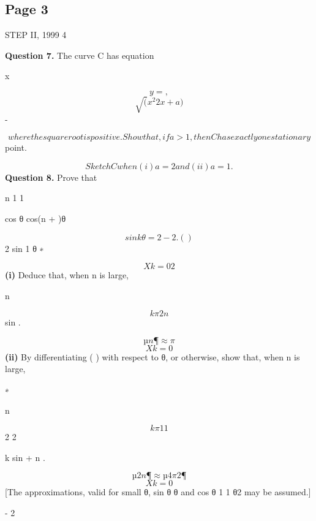 \documentclass[12pt]{article}
\begin{document}
\subsection*{Page 3}
\begin{flushleft}
STEP II, 1999 4\par
\bigskip\textbf{Question 7.} The curve C has equation\par
x\par
\[y = ,\]
\[\sqrt(x^2 2x + a)\]
-\par
\[where the square root is positive. Show that, if a > 1, then C has exactly one stationary\]
point.\par
\[Sketch C when (i) a = 2 and (ii) a = 1.\]
\bigskip\textbf{Question 8.} Prove that\par
n 1 1\par
cos θ cos(n + )θ\par
\[sin kθ = 2 - 2 . ( )\]
2 sin 1 θ ∗\par
\[Xk=0 2\]
\textbf{(i)} Deduce that, when n is large,\par
n\par
\[k\pi 2n\]
sin .\par
\[µ n ¶ \approx \pi\]
\[Xk=0\]
\textbf{(ii)} By differentiating ( ) with respect to θ, or otherwise, show that, when n is large,\par
∗\par
n\par
\[k\pi 1 1\]
2 2\par
k sin + n .\par
\[µ 2n ¶ \approx µ 4 \pi2 ¶\]
\[Xk=0\]
[The approximations, valid for small θ, sin θ θ and cos θ 1 1 θ2 may be assumed.]\par
\approx \approx - 2\par
\end{flushleft}
\end{document}
